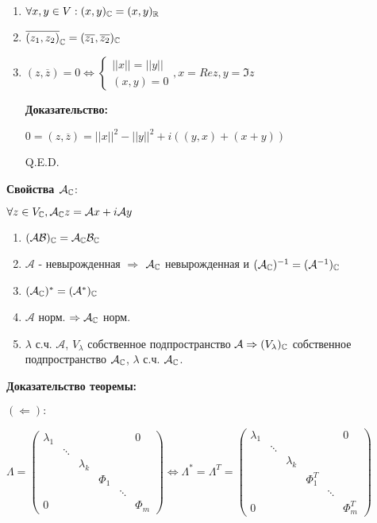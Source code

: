 \begin{enumerate}
    \item $\forall x,y \in V: (x,y)_{\mathbb{C}} = (x,y)_{\mathbb{R}}$
    \item $\overline{(z_1,z_2)}_{\mathbb{C}} = (\overline{z_1},\overline{z_2})_{\mathbb{C}}$
    \item $(z,\overline{z}) = 0 \Leftrightarrow \begin{cases}
        ||x|| =||y|| \\
        (x,y) = 0
    \end{cases}, x = Re z, y = \Im z$

    \textbf{Доказательство:}

    $0 = (z,\overline{z})= ||x||^2 -||y||^2 + i((y,x) + (x+y))$

    \hfill Q.E.D.
\end{enumerate}




\textbf{Свойства $\mathcal{A}_{\mathbb{C}}$}:

$\forall z \in V_{\mathbb{C}}, \mathcal{A}_{\mathbb{C}} z=\mathcal{A}x + i \mathcal{A}y$

\begin{enumerate}
    \item $(\mathcal{A}\mathcal{B})_{\mathbb{C}} = \mathcal{A}_{\mathbb{C}} \mathcal{B}_{\mathbb{C}}$
    \item $\mathcal{A}$ -  невырожденная $\Rightarrow$ $\mathcal{A}_{\mathbb{C}}$ невырожденная и $(\mathcal{A}_{\mathbb{C}})^{-1} = (\mathcal{A}^{-1})_{\mathbb{C}}$
    \item $(\mathcal{A}_{\mathbb{C}})^* = (\mathcal{A}^*)_{\mathbb{C}}$
    
    \item $\mathcal{A}$ норм. $\Rightarrow \mathcal{A}_{\mathbb{C}}$ норм.
    \item $\lambda$ с.ч. $\mathcal{A}$, $V_{\lambda}$ собственное подпространство $\mathcal{A} \Rightarrow (V_{\lambda})_{\mathbb{C}}$ собственное подпространство $\mathcal{A}_{\mathbb{C}}$, $\lambda$ с.ч. $\mathcal{A}_{\mathbb{C}}$. 
\end{enumerate}

\textbf{Доказательство теоремы:}

 $(\Leftarrow):$

$\Lambda = \begin{pmatrix}
    \lambda_1 & & & & &0\\
    & \ddots & & & &\\
    & & \lambda_k & & &\\
    & & & \Phi_1 & &\\
    & & & & \ddots & \\
    0& & & & & \Phi_m
\end{pmatrix} \Leftrightarrow\Lambda^* = \Lambda^T = \begin{pmatrix}
    \lambda_1 & & & & &0\\
    & \ddots & & & &\\
    & & \lambda_k & & &\\
    & & & \Phi_1^T & &\\
    & & & & \ddots & \\
    0& & & & & \Phi_m^T
\end{pmatrix}$ 

